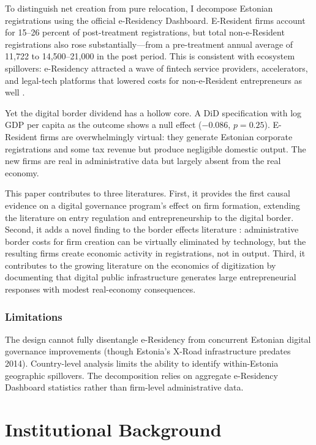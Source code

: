 \documentclass[12pt]{article}
\begin{document}
To distinguish net creation from pure relocation, I decompose Estonian registrations using the official e-Residency Dashboard. E-Resident firms account for 15--26 percent of post-treatment registrations, but total non-e-Resident registrations also rose substantially---from a pre-treatment annual average of 11,722 to 14,500--21,000 in the post period. This is consistent with ecosystem spillovers: e-Residency attracted a wave of fintech service providers, accelerators, and legal-tech platforms that lowered costs for non-e-Resident entrepreneurs as well \citep{kotka2015, tammpuu2019}.

Yet the digital border dividend has a hollow core. A DiD specification with log GDP per capita as the outcome shows a null effect ($-0.086$, $p = 0.25$). E-Resident firms are overwhelmingly virtual: they generate Estonian corporate registrations and some tax revenue but produce negligible domestic output. The new firms are real in administrative data but largely absent from the real economy.

This paper contributes to three literatures. First, it provides the first causal evidence on a digital governance program's effect on firm formation, extending the literature on entry regulation and entrepreneurship \citep{djankov2002, bruhn2011, kaplan2011} to the digital border. Second, it adds a novel finding to the border effects literature \citep{mccallum1995, andersonvanwincoop2003}: administrative border costs for firm creation can be virtually eliminated by technology, but the resulting firms create economic activity in registrations, not in output. Third, it contributes to the growing literature on the economics of digitization \citep{goldfarb2019} by documenting that digital public infrastructure generates large entrepreneurial responses with modest real-economy consequences.

\subsubsection*{Limitations} The design cannot fully disentangle e-Residency from concurrent Estonian digital governance improvements (though Estonia's X-Road infrastructure predates 2014). Country-level analysis limits the ability to identify within-Estonia geographic spillovers. The decomposition relies on aggregate e-Residency Dashboard statistics rather than firm-level administrative data.

\section{Institutional Background}
\end{document}
